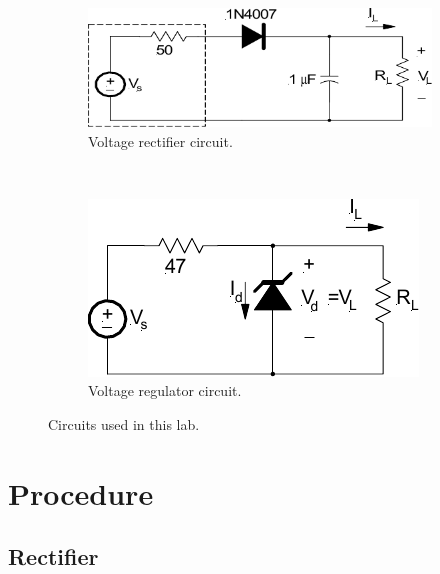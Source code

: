\documentclass{article}
\begin{document}
\begin{figure}[hbtp]
  \centering
  \begin{subfigure}[b]{0.6\textwidth}
    \includegraphics[width=\textwidth]{volt_rect}
    \caption{\label{fig:volt_rect} Voltage rectifier circuit.}
  \end{subfigure}%
  ~
  \begin{subfigure}[b]{0.4\textwidth}
    \includegraphics[width=\textwidth]{volt_reg}
    \caption{\label{fig:volt_reg} Voltage regulator circuit.}
  \end{subfigure}
  \caption{\label{fig:circuits_tested} Circuits used in this lab.}
\end{figure}

\section{Procedure}
\label{sec:procedure}

\subsection{Rectifier}
\label{sec:rectifier}

\end{document}
